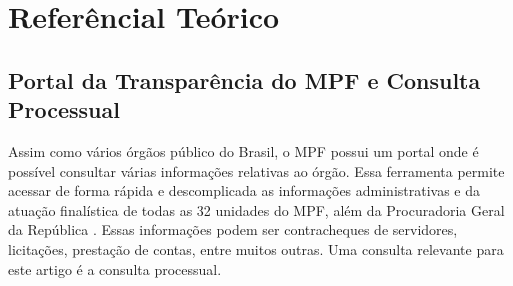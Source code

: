 \section{Referêncial Teórico}

\subsection{Portal da Transparência do MPF e Consulta Processual}

Assim como vários órgãos público do Brasil, o MPF possui um portal onde é possível consultar várias informações relativas ao órgão. Essa ferramenta permite acessar de forma rápida e descomplicada as informações administrativas e da atuação finalística de todas as 32 unidades do MPF, além da Procuradoria Geral da República \cite{Transparencia_MPF_Sobre}. Essas informações podem ser contracheques de servidores, licitações, prestação de contas, entre muitos outras. Uma consulta relevante para este artigo é a consulta processual. 
